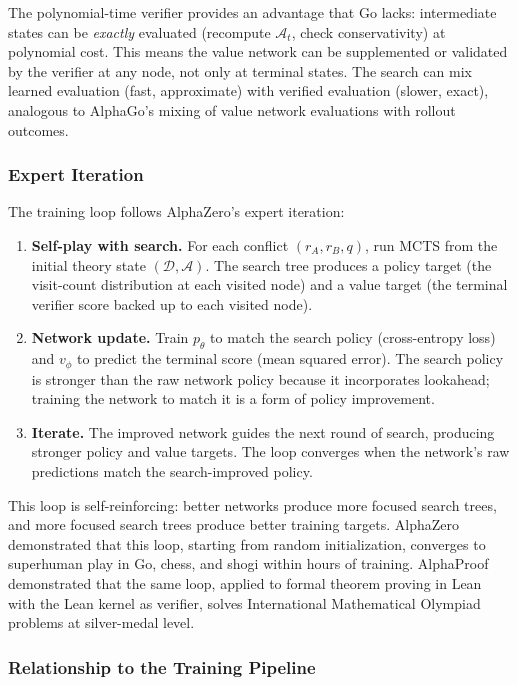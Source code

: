 \documentclass{article}
\newcommand{\D}{\mathcal{D}}
\begin{document}
The polynomial-time verifier provides an advantage that Go lacks: intermediate states can be \emph{exactly} evaluated (recompute $\mathcal{A}_t$, check conservativity) at polynomial cost. This means the value network can be supplemented or validated by the verifier at any node, not only at terminal states. The search can mix learned evaluation (fast, approximate) with verified evaluation (slower, exact), analogous to AlphaGo's mixing of value network evaluations with rollout outcomes.

\subsubsection{Expert Iteration}

The training loop follows AlphaZero's expert iteration:
\begin{enumerate}[nosep]
    \item \textbf{Self-play with search.} For each conflict $(r_A, r_B, q)$, run MCTS from the initial theory state $(\D, \mathcal{A})$. The search tree produces a policy target (the visit-count distribution at each visited node) and a value target (the terminal verifier score backed up to each visited node).
    \item \textbf{Network update.} Train $p_\theta$ to match the search policy (cross-entropy loss) and $v_\phi$ to predict the terminal score (mean squared error). The search policy is stronger than the raw network policy because it incorporates lookahead; training the network to match it is a form of policy improvement.
    \item \textbf{Iterate.} The improved network guides the next round of search, producing stronger policy and value targets. The loop converges when the network's raw predictions match the search-improved policy.
\end{enumerate}

This loop is self-reinforcing: better networks produce more focused search trees, and more focused search trees produce better training targets. AlphaZero demonstrated that this loop, starting from random initialization, converges to superhuman play in Go, chess, and shogi within hours of training. AlphaProof~\cite{alphaproof2025} demonstrated that the same loop, applied to formal theorem proving in Lean with the Lean kernel as verifier, solves International Mathematical Olympiad problems at silver-medal level.

\subsubsection{Relationship to the Training Pipeline}
\end{document}
